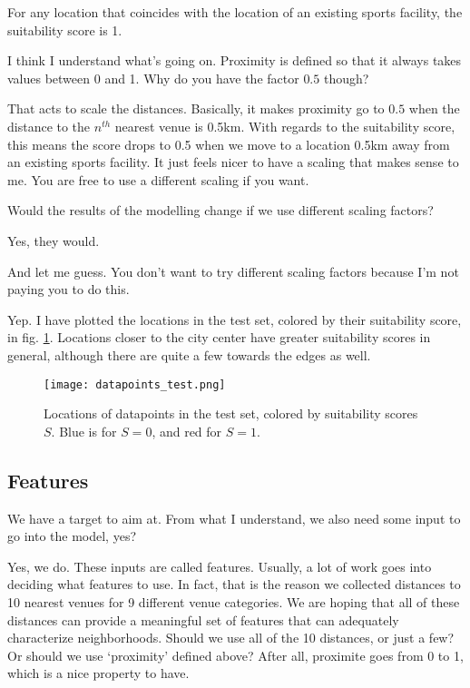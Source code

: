 For any location that coincides with the location of an existing sports facility, the suitability score is 1. 

{\color{blue} I think I understand what's going on. Proximity is defined so that it always takes values between 0 and 1. Why do you have the factor $0.5$ though?}

That acts to scale the distances. Basically, it makes proximity go to $0.5$ when the distance to the $n^{th}$ nearest venue is 0.5km. With regards to the suitability score, this means the score drops to 0.5 when we move to a location 0.5km away from an existing sports facility. It just feels nicer to have a scaling that makes sense to me. You are free to use a different scaling if you want. 

{\color{blue} Would the results of the modelling change if we use different scaling factors?}

Yes, they would. 

{\color{blue} And let me guess. You don't want to try different scaling factors because I'm not paying you to do this.}

Yep. I have plotted the locations in the test set, colored by their suitability score, in fig. \ref{fig:datapoints-test}. Locations closer to the city center have greater suitability scores in general, although there are quite a few towards the edges as well. 

\begin{figure}
	\centering
	\texttt{[image: datapoints\_test.png]}
	\caption{Locations of datapoints in the test set, colored by suitability scores $S$. Blue is for $S=0$, and red for $S=1$. \label{fig:datapoints-test}}
\end{figure}



\subsection{Features}
{\color{blue} We have a target to aim at. From what I understand, we also need some input to go into the model, yes?}


Yes, we do. These inputs are called features. Usually, a lot of work goes into deciding what features to use. In fact, that is the reason we collected distances to 10 nearest venues for 9 different venue categories. We are hoping that all of these distances can provide a meaningful set of features that can adequately characterize neighborhoods. Should we use all of the 10 distances, or just a few? Or should we use `proximity' defined above? After all, proximite goes from 0 to 1, which is a nice property to have. 

